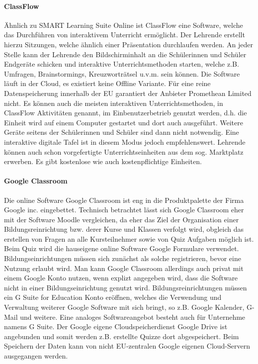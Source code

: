 \paragraph{ClassFlow}
Ähnlich zu SMART Learning Suite Online ist ClassFlow eine Software, welche das 
Durchführen von interaktivem Unterricht ermöglicht. Der Lehrende erstellt hierzu Sitzungen, welche ähnlich einer Präsentation durchlaufen werden. An jeder Stelle kann der Lehrende den Bildschirminhalt an die Schülerinnen und Schüler Endgeräte schicken und interaktive Unterrichtsmethoden starten, welche z.B. Umfragen, Brainstormings, Kreuzworträtsel u.v.m. sein können. Die Software läuft in der Cloud, es existiert keine Offline Variante. Für eine reine Datenspeicherung innerhalb der EU garantiert der Anbieter Promethean Limited nicht\cite{Limited2017}. Es können auch die meisten interaktiven Unterrichtsmethoden, in ClassFlow Aktivitäten genannt, im Einbenutzerbetrieb genutzt werden, d.h. die Einheit wird auf einem Computer gestartet und dort auch ausgeführt. Weitere Geräte seitens der Schülerinnen und Schüler sind dann nicht notwendig. Eine interaktive digitale Tafel ist in diesem Modus jedoch empfehlenswert. Lehrende können auch schon vorgefertigte Unterrichtseinheiten aus dem sog. Marktplatz erwerben. Es gibt kostenlose wie auch kostenpflichtige Einheiten. 

\paragraph{Google Classroom}
Die online Software Google Classroom ist eng in die Produktpalette der Firma Google inc. eingebettet. Technisch betrachtet lässt sich Google Classroom eher mit der Software Moodle vergleichen, da eher das Ziel der Organisation einer Bildungsreinrichtung bzw. derer Kurse und Klassen verfolgt wird, obgleich das erstellen von Fragen an alle Kursteilnehmer sowie von Quiz Aufgaben möglich ist. Beim Quiz wird die hauseigene online Software Google Formulare verwendet. Bildungseinrichtungen müssen sich zunächst als solche registrieren, bevor eine Nutzung erlaubt wird. Man kann Google Classroom allerdings auch privat mit einem Google Konto nutzen, wenn explizt angegeben wird, dass die Software nicht in einer Bildungseinrichtung genutzt wird. Bildungsreinrichtungen müssen ein G Suite for Education Konto eröffnen, welches die Verwendung und Verwaltung weiterer Google Software mit sich bringt, so z.B. Google Kalender, G-Mail und weitere. Eine analoges Softwareangebot besteht auch für Unternehme namens G Suite. Der Google eigene Cloudspeicherdienst Google Drive ist angebunden und somit werden z.B. erstellte Quizze dort abgespeichert.  Beim Speichern der Daten kann von nicht EU-zentralen Google eigenen Cloud-Servern ausgegangen werden. 

